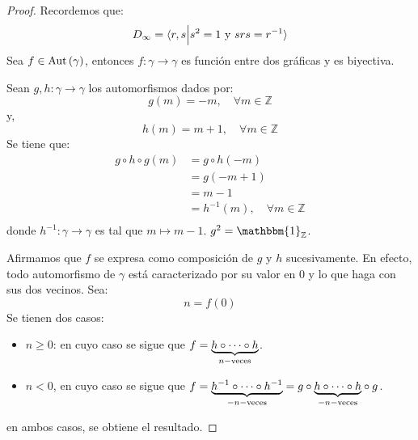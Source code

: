 \documentclass[12pt]{report}
\newcounter{it}
\theoremstyle{largebreak}
\newcommand\cf[3]{\ensuremath{#1:#2\rightarrow#3}}
\newcommand{\bbm}[1]{\ensuremath{\mathbbm{#1}}}
\newcommand{\Aut}[1]{\ensuremath{\textup{Aut}\left(#1\right)}}
\newcommand{\gen}[1]{\ensuremath{\langle#1\rangle}}
\begin{document}
    \begin{proof}
        Recordemos que:
        \begin{equation*}
            D_\infty=\gen{r,s\Big|s^2=1\textup{ y }srs=r^{-1}}
        \end{equation*}
        Sea $f\in\Aut{\gamma}$, entonces $\cf{f}{\gamma}{\gamma}$ es función entre dos gráficas y es biyectiva.

        Sean $\cf{g,h}{\gamma}{\gamma}$ los automorfismos dados por:
        \begin{equation*}
            g(m)=-m,\quad\forall m\in\mathbb{Z}
        \end{equation*}
        y,
        \begin{equation*}
            h(m)=m+1,\quad\forall m\in\mathbb{Z}
        \end{equation*}
        Se tiene que:
        \begin{equation*}
            \begin{split}
                g\circ h\circ g(m)&=g\circ h(-m)\\
                &=g(-m+1)\\
                &=m-1\\
                &=h^{-1}(m),\quad\forall m\in\mathbb{Z} \\
            \end{split}
        \end{equation*}
        donde $\cf{h^{-1}}{\gamma}{\gamma}$ es tal que $m\mapsto m-1$. $g^2=\bbm{1}_\mathbb{Z}$.

        Afirmamos que $f$ se expresa como composición de $g$ y $h$ sucesivamente. En efecto, todo automorfismo de $\gamma$ está caracterizado por su valor en 0 y lo que haga con sus dos vecinos. Sea:
        \begin{equation*}
            n=f(0)
        \end{equation*}
        Se tienen dos casos:
        \begin{itemize}
            \item $n\geq0$: en cuyo caso se sigue que $f=\underset{n-\textup{veces}}{\underbrace{h\circ\cdots\circ h}}$.
            \item $n<0$, en cuyo caso se sigue que $f=\underset{-n-\textup{veces}}{\underbrace{h^{-1}\circ\cdots\circ h^{-1}}}=g\circ\underset{-n-\textup{veces}}{\underbrace{h\circ\cdots\circ h}}\circ g$.
        \end{itemize}
        en ambos casos, se obtiene el resultado.
    \end{proof}
\end{document}

